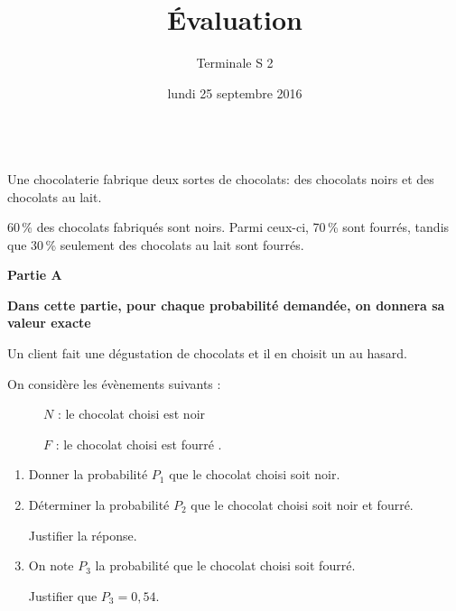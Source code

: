 \documentclass[12pt,a4paper,french]{article}
\title{Évaluation \no{2}}
\author{Terminale S 2}
\date{lundi 25 septembre 2016}
\begin{document}
\maketitle
\thispagestyle{fancy}

\medskip

\begin{question}~\\[-5mm]
  Une chocolaterie fabrique deux sortes de chocolats: des chocolats
  noirs et des chocolats au lait.

  60\,\% des chocolats fabriqués sont noirs. Parmi ceux-ci, 70\,\% sont
  fourrés, tandis que 30\,\% seulement
  des chocolats au lait sont fourrés.

  \bigskip

  \textbf{Partie A}

  \medskip

  \textbf{Dans cette partie, pour chaque probabilité demandée, on
  donnera sa valeur exacte}

  \medskip

  Un client fait une dégustation de chocolats et il en choisit un au
  hasard.

  On considère les évènements suivants :
  \setlength\parindent{8mm}
  \begin{description}
    \item[ ]$N$ : \og le chocolat choisi est noir\fg
    \item[ ]$F$ : \og le chocolat choisi est fourré \fg. 
  \end{description}
  \setlength\parindent{0mm}
  \medskip

  \begin{enumerate}
    \item Donner la probabilité $P_1$ que le chocolat choisi soit noir.
    \item Déterminer la probabilité $P_2$ que le chocolat choisi soit
      noir et fourré.

      Justifier la réponse.
    \item On note $P_3$ la probabilité que le chocolat choisi soit
      fourré.

      Justifier que $P_3 = 0,54$.
  \end{enumerate}
\end{question}
\end{document}
